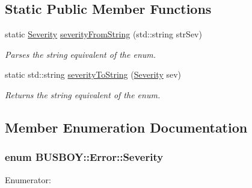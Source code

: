 \subsection*{Static Public Member Functions}
\begin{DoxyCompactItemize}
\item 
static \hyperlink{classBUSBOY_1_1Error_a999444a8876433731c3d2e824d4c23e4}{Severity} \hyperlink{classBUSBOY_1_1Error_ac96052d161b66ee70c5412d1dc4e0d83}{severityFromString} (std::string strSev)
\begin{DoxyCompactList}\small\item\em Parses the string equivalent of the enum. \item\end{DoxyCompactList}\item 
static std::string \hyperlink{classBUSBOY_1_1Error_a82fb2633bf6995246b1e5046198da5fa}{severityToString} (\hyperlink{classBUSBOY_1_1Error_a999444a8876433731c3d2e824d4c23e4}{Severity} sev)
\begin{DoxyCompactList}\small\item\em Returns the string equivalent of the enum. \item\end{DoxyCompactList}\end{DoxyCompactItemize}


\subsection{Member Enumeration Documentation}
\hypertarget{classBUSBOY_1_1Error_a999444a8876433731c3d2e824d4c23e4}{
\subsubsection[{Severity}]{\setlength{\rightskip}{0pt plus 5cm}enum {\bf BUSBOY::Error::Severity}}}
\label{classBUSBOY_1_1Error_a999444a8876433731c3d2e824d4c23e4}
\begin{Desc}
\item[Enumerator: ]\par
\begin{description}
\item[{\em 
\hypertarget{classBUSBOY_1_1Error_a999444a8876433731c3d2e824d4c23e4af2ae2960567ee543590295810f6d5a42}{
WARN}
\label{classBUSBOY_1_1Error_a999444a8876433731c3d2e824d4c23e4af2ae2960567ee543590295810f6d5a42}
}]\item[{\em 
\hypertarget{classBUSBOY_1_1Error_a999444a8876433731c3d2e824d4c23e4ad5def28eef2a0448eb28e4e313b3cddb}{
ERROR}
\label{classBUSBOY_1_1Error_a999444a8876433731c3d2e824d4c23e4ad5def28eef2a0448eb28e4e313b3cddb}
}]\end{description}
\end{Desc}



